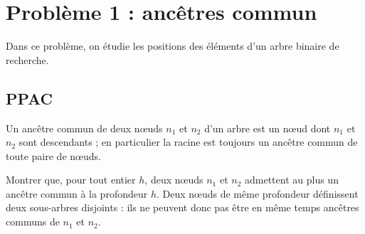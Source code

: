 \section{Problème 1 : ancêtres commun}
Dans ce problème, on étudie les positions des éléments d'un arbre binaire de recherche.
\subsection{PPAC}
Un ancêtre commun de deux nœuds $n_1$ et $n_2$ d'un arbre est un nœud dont $n_1$ et $n_2$ sont descendants ; en particulier la racine est toujours un ancêtre commun de toute paire de nœuds.
\begin{question}{}{}
Montrer que, pour tout entier $h$, deux nœuds $n_1$ et $n_2$ admettent au plus un ancêtre commun à la profondeur $h$.
\reponse
Deux nœuds de même profondeur définissent deux sous-arbres disjoints : ils ne peuvent donc pas être en même temps ancêtres communs de $n_1$ et $n_2$.
\end{question}

